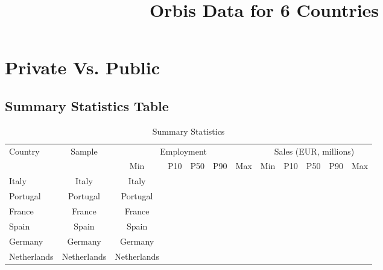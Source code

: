 \documentclass[12pt,notitlepage]{article}
\title{Orbis Data for 6 Countries}
\author{}
\date{}
\begin{document}
\maketitle
\tableofcontents
\pagebreak



\FloatBarrier
\section{Private Vs. Public} %
\label{sec:private_vs_public}
\FloatBarrier

\subsection{Summary Statistics Table}
\begin{table}[!htpb]
\caption{Summary Statistics}
\begin{tabular}{l*{11}{c}}
\hline
Country & Sample & \multicolumn{5}{c}{Employment} & \multicolumn{5}{c}{Sales (EUR, millions)} \\ \cline{3-7} \cline{8-12}
		&		 & Min & P10 & P50 & P90 & Max & Min & P10 & P50 & P90 & Max \\  \hline
Italy &  
Italy &   
Italy &   \\
Portugal &  
Portugal &  
Portugal &  \\ 
France &   
France &   
France &    \\
Spain &   
Spain &   
Spain &    \\
Germany &   
Germany &   
Germany &    \\
Netherlands &   
Netherlands &   
Netherlands &    
\end{tabular}
\end{table}
\end{document}
